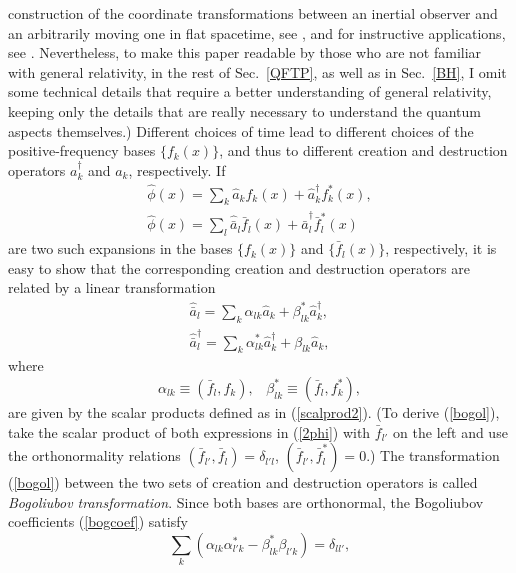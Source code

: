 \documentclass[12pt]{article}
\begin{document}
construction of the coordinate transformations between 
an inertial observer and an arbitrarily moving one 
in flat spacetime, see \cite{nels,nikpra}, and for instructive applications, 
see \cite{nikpra,nikajp,niktwin}.
Nevertheless, to make this paper readable by those who are not 
familiar with general relativity, in the rest of Sec.~\ref{QFTP}, 
as well as in Sec.~\ref{BH}, I omit some technical 
details that require a better understanding of general relativity, 
keeping only the details that are really necessary to understand 
the quantum aspects themselves.)
Different choices of time lead to different choices of the 
positive-frequency bases $\{ f_k(x) \}$, and thus to different 
creation and destruction operators $a_k^{\dagger}$ and $a_k$, 
respectively. If
\begin{eqnarray}\label{2phi}
& \hat{\phi}(x)=\displaystyle\sum_k 
\hat{a}_kf_k(x)+\hat{a}_k^{\dagger}f_k^*(x) , & \nonumber \\
& \hat{\phi}(x)=\displaystyle\sum_l \hat{\bar{a}}_l\bar{f}_l(x)+
\hat{\bar{a}}_l^{\dagger}\bar{f}_l^*(x)  &
\end{eqnarray} 
are two such expansions in the bases $\{ f_k(x) \}$
and $\{ \bar{f}_l(x) \}$, respectively, 
it is easy to show that the corresponding 
creation and destruction operators are related by a linear 
transformation 
\begin{eqnarray}\label{bogol}
& \hat{\bar{a}}_l = \displaystyle\sum_k \alpha_{lk} \hat{a}_k +
\beta^*_{lk} \hat{a}_k^{\dagger} , & \nonumber \\
& \hat{\bar{a}}_l^{\dagger} = \displaystyle\sum_k 
\alpha^*_{lk} \hat{a}_k^{\dagger} + \beta_{lk} \hat{a}_k ,
\end{eqnarray}
where 
\begin{equation}\label{bogcoef}
\alpha_{lk}\equiv (\bar{f}_l,f_k) , \;\;\;
\beta^*_{lk}\equiv (\bar{f}_l,f_k^*) ,
\end{equation}
are given by the scalar products defined as in (\ref{scalprod2}).
(To derive (\ref{bogol}), take the scalar product of both expressions
in (\ref{2phi}) with $\bar{f}_{l'}$ on the left and use
the orthonormality relations 
$(\bar{f}_{l'},\bar{f}_{l})=\delta_{l'l}$, 
$(\bar{f}_{l'},\bar{f}^*_{l})=0$.)
The transformation (\ref{bogol}) between the two sets of 
creation and destruction operators is called {\em Bogoliubov
transformation}. Since both bases are orthonormal, the Bogoliubov
coefficients (\ref{bogcoef}) satisfy
\begin{equation}\label{bogol2}
\sum_k (\alpha_{lk}\alpha^*_{l'k}-\beta^*_{lk}\beta_{l'k})=\delta_{ll'} ,
\end{equation}
\end{document}
